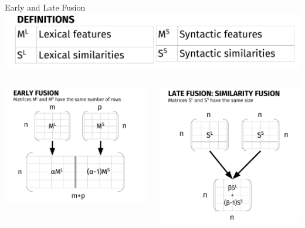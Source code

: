 \documentclass[10pt,=table]{beamer}
\begin{document}
\begin{frame}{Early and Late Fusion}
\centering
{}\includegraphics[width=.8\linewidth]{image2/Chapitre3/definition_S_L.pdf}
\vfill
\begin{columns}
	\begin{minipage}[c][0.5\textheight][c]{\linewidth}
		\centering
		\includegraphics[width=1\linewidth]{image2/Chapitre3/ef_diag}
		\end{minipage}
	\begin{minipage}[c][0.5\textheight][c]{\linewidth}
		\centering
		\includegraphics[width=1\linewidth]{image2/Chapitre3/lf2_diag.pdf}
	\end{minipage}
\end{columns}





\end{frame}
\end{document}
